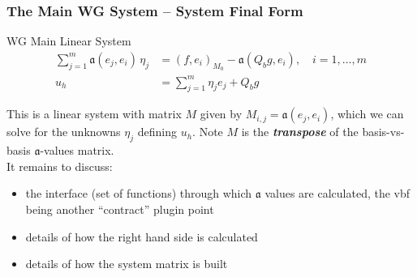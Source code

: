 \documentclass[compress]{beamer}
\begin{document}
\begin{frame}
  \frametitle{The Main WG System -- System Final Form}
  \begin{block}{WG Main Linear System}
    \begin{align*}
      \sum_{j=1}^m{\mathfrak{a}(e_j, e_i) \,\eta_j} &= (f, e_i)_{M_0} - \mathfrak{a}(Q_b g, e_i), \quad i=1,\dots,m\\
      u_h &= \sum_{j=1}^m{\eta_j e_j} + Q_b g
    \end{align*}

  \end{block}  
  \pause
  This is a linear system with matrix $M$ given by $M_{i,j} = \mathfrak{a}(e_j, e_i)$, which we can solve for the unknowns
  $\eta_j$ defining $u_h$.  Note $M$ is the \emph{\textbf{transpose}} of the basis-vs-basis $\mathfrak{a}$-values matrix.\\
  \pause
  It remains to discuss:
  \begin{itemize}[<+->]
    \item the interface (set of functions) through which $\mathfrak{a}$ values are calculated,
      the vbf being another ``contract'' plugin point
    \item details of how the right hand side is calculated
    \item details of how the system matrix is built
  \end{itemize}

\end{frame}
\end{document}
